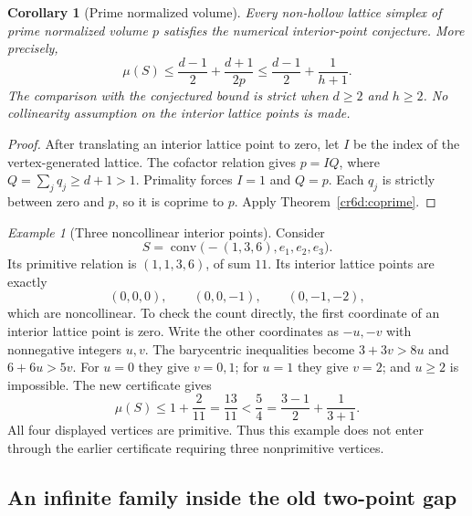 \documentclass[11pt,a4paper]{article}
\newtheorem{corollary}[theorem]{Corollary}
\theoremstyle{remark}\newtheorem{remark}[theorem]{Remark}
\newtheorem{example}[theorem]{Example}
\begin{document}
\begin{corollary}[Prime normalized volume]\label{cr6d:prime}
Every non-hollow lattice simplex of prime normalized volume $p$
satisfies the numerical interior-point conjecture.  More precisely,
\[
 \mu(S)\le\frac{d-1}{2}+\frac{d+1}{2p}
 \le\frac{d-1}{2}+\frac1{h+1}.
\]
The comparison with the conjectured bound is strict when
$d\ge2$ and $h\ge2$.  No collinearity assumption on the interior
lattice points is made.
\end{corollary}
\begin{proof}
After translating an interior lattice point to zero, let
$I$ be the index of the vertex-generated lattice.  The cofactor
relation gives $p=IQ$, where $Q=\sum_jq_j\ge d+1>1$.
Primality forces $I=1$ and $Q=p$.  Each $q_j$ is strictly
between zero and $p$, so it is coprime to $p$.
Apply Theorem~\ref{cr6d:coprime}.
\end{proof}

\begin{example}[Three noncollinear interior points]\label{cr6d:example}
Consider
\[
 S=\operatorname{conv}\bigl(-(1,3,6),e_1,e_2,e_3\bigr).
\]
Its primitive relation is $(1,1,3,6)$, of sum $11$.
Its interior lattice points are exactly
\[
 (0,0,0),\qquad (0,0,-1),\qquad (0,-1,-2),
\]
which are noncollinear.  To check the count directly, the first
coordinate of an interior lattice point is zero.  Write the
other coordinates as $-u,-v$ with nonnegative integers $u,v$.
The barycentric inequalities become
$3+3v>8u$ and $6+6u>5v$.
For $u=0$ they give $v=0,1$; for $u=1$ they give $v=2$;
and $u\ge2$ is impossible.  The new certificate gives
\[
 \mu(S)\le1+\frac2{11}=\frac{13}{11}
 <\frac54=\frac{3-1}{2}+\frac1{3+1}.
\]
All four displayed vertices are primitive.  Thus this example
does not enter through the earlier certificate requiring
three nonprimitive vertices.
\end{example}

\subsection{An infinite family inside the old two-point gap}
\end{document}
